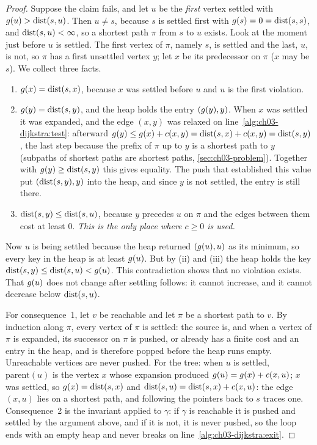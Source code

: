 \begin{proof}
Suppose the claim fails, and let $u$ be the \emph{first} vertex settled with
$g(u)>\operatorname{dist}(s,u)$. Then $u\neq s$, because $s$ is settled first with
$g(s)=0=\operatorname{dist}(s,s)$, and $\operatorname{dist}(s,u)<\infty$, so a shortest path $\pi$ from $s$ to $u$
exists. Look at the moment just before $u$ is settled. The first vertex of $\pi$, namely $s$, is
settled and the last, $u$, is not, so $\pi$ has a first unsettled vertex $y$; let $x$ be its
predecessor on $\pi$ ($x$ may be $s$). We collect three facts.
\begin{enumerate}[label=(\roman*)]
  \item $g(x)=\operatorname{dist}(s,x)$, because $x$ was settled before $u$ and $u$ is the first
violation.
  \item $g(y)=\operatorname{dist}(s,y)$, and the heap holds the entry $(g(y),y)$. When $x$ was
settled it was expanded, and the edge $(x,y)$ was relaxed on line~\ref{alg:ch03-dijkstra:test}:
afterward $g(y)\le g(x)+c(x,y)=\operatorname{dist}(s,x)+c(x,y)=\operatorname{dist}(s,y)$, the last step because
the prefix of $\pi$ up to $y$ is a shortest path to $y$ (subpaths of shortest paths are shortest
paths, \cref{sec:ch03-problem}). Together with $g(y)\ge\operatorname{dist}(s,y)$ this gives equality.
The push that established this value put $(\operatorname{dist}(s,y),y)$ into the heap, and since $y$ is not
settled, the entry is still there.
  \item $\operatorname{dist}(s,y)\le\operatorname{dist}(s,u)$, because $y$ precedes $u$ on $\pi$ and the edges between
them cost at least 0. \emph{This is the only place where $c\ge0$ is used.}
\end{enumerate}
Now $u$ is being settled because the heap returned $(g(u),u)$ as its minimum, so every key
in the heap is at least $g(u)$. But by (ii) and (iii) the heap holds the key
$\operatorname{dist}(s,y)\le\operatorname{dist}(s,u)<g(u)$. This contradiction shows that no violation exists. That
$g(u)$ does not change after settling follows: it cannot increase, and it cannot decrease
below $\operatorname{dist}(s,u)$.

For consequence~1, let $v$ be reachable and let $\pi$ be a shortest path to $v$. By induction
along $\pi$, every vertex of $\pi$ is settled: the source is, and when a vertex of $\pi$ is
expanded, its successor on $\pi$ is pushed, or already has a finite cost and an entry in the
heap, and is therefore popped before the heap runs empty. Unreachable vertices are never
pushed. For the tree: when $u$ is settled, $\mathrm{parent}(u)$ is the vertex $x$ whose
expansion produced $g(u)=g(x)+c(x,u)$; $x$ was settled, so $g(x)=\operatorname{dist}(s,x)$ and
$\operatorname{dist}(s,u)=\operatorname{dist}(s,x)+c(x,u)$: the edge $(x,u)$ lies on a shortest path, and following the
pointers back to $s$ traces one. Consequence~2 is the invariant applied to $\gamma$: if $\gamma$ is
reachable it is pushed and settled by the argument above, and if it is not, it is never
pushed, so the loop ends with an empty heap and never breaks on line~\ref{alg:ch03-dijkstra:exit}.
\end{proof}

